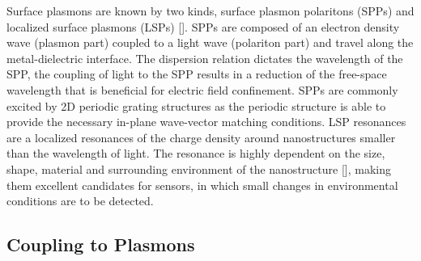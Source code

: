 Surface plasmons are known by two kinds, surface plasmon polaritons (SPPs) and localized surface plasmons (LSPs) [\cite{MaierBook}]. SPPs are composed of an electron density wave (plasmon part) coupled to a light wave (polariton part) and travel along the metal-dielectric interface. The dispersion relation dictates the wavelength  of the SPP, the coupling of light to the SPP results in a reduction of the free-space wavelength that is beneficial for electric field confinement. SPPs are commonly excited by 2D periodic grating structures as the periodic structure is able to provide the necessary in-plane wave-vector matching conditions. LSP resonances are a localized resonances of the charge density around nanostructures smaller than the wavelength of light. The resonance is highly dependent on the size, shape, material and surrounding environment of the nanostructure [\cite{Link1}], making them excellent candidates for sensors, in which small changes in environmental conditions are to be detected.

\subsection{Coupling to Plasmons}
\label{deriv}

